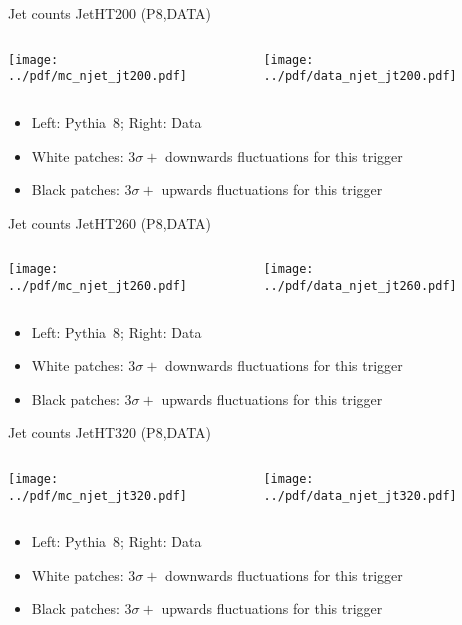 \documentclass[9pt]{beamer}
\begin{document}
\begin{frame}[t]{Jet counts JetHT200 (P8,DATA)}
\begin{columns}[T]
  \begin{column}{.5\textwidth}
  \texttt{[image: ../pdf/mc\_njet\_jt200.pdf]}
  \end{column}
  \begin{column}{.5\textwidth}
  \texttt{[image: ../pdf/data\_njet\_jt200.pdf]}
  \end{column}
\end{columns}
\begin{itemize}
 \item Left: Pythia~8; Right: Data
 \item White patches: $3\sigma+$ downwards fluctuations for this trigger
 \item Black patches: $3\sigma+$ upwards fluctuations for this trigger
\end{itemize}
\end{frame}

\begin{frame}[t]{Jet counts JetHT260 (P8,DATA)}
\begin{columns}[T]
  \begin{column}{.5\textwidth}
  \texttt{[image: ../pdf/mc\_njet\_jt260.pdf]}
  \end{column}
  \begin{column}{.5\textwidth}
  \texttt{[image: ../pdf/data\_njet\_jt260.pdf]}
  \end{column}
\end{columns}
\begin{itemize}
 \item Left: Pythia~8; Right: Data
 \item White patches: $3\sigma+$ downwards fluctuations for this trigger
 \item Black patches: $3\sigma+$ upwards fluctuations for this trigger
\end{itemize}
\end{frame}

\begin{frame}[t]{Jet counts JetHT320 (P8,DATA)}
\begin{columns}[T]
  \begin{column}{.5\textwidth}
  \texttt{[image: ../pdf/mc\_njet\_jt320.pdf]}
  \end{column}
  \begin{column}{.5\textwidth}
  \texttt{[image: ../pdf/data\_njet\_jt320.pdf]}
  \end{column}
\end{columns}
\begin{itemize}
 \item Left: Pythia~8; Right: Data
 \item White patches: $3\sigma+$ downwards fluctuations for this trigger
 \item Black patches: $3\sigma+$ upwards fluctuations for this trigger
\end{itemize}
\end{frame}
\end{document}
